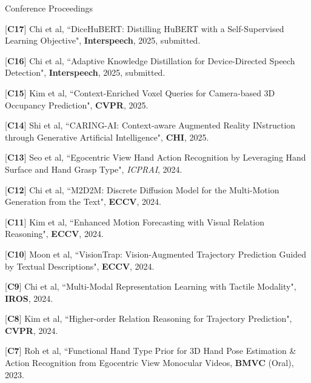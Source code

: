 


\begin{cventries}
\cvpub
{Conference Proceedings} %
{ %
\begin{cvitems}
    \item {[\textbf{C17}] Chi et al, ``DiceHuBERT: Distilling HuBERT with a Self-Supervised Learning Objective", \textbf{Interspeech}, 2025, submitted.}
    \item {[\textbf{C16}] Chi et al, ``Adaptive Knowledge Distillation for Device-Directed Speech Detection", \textbf{Interspeech}, 2025, submitted.}
    \item {[\textbf{C15}] Kim et al, ``Context-Enriched Voxel Queries for Camera-based 3D Occupancy Prediction", \textbf{CVPR}, 2025.}
    \item {[\textbf{C14}] Shi et al, ``CARING-AI: Context-aware Augmented Reality INstruction through Generative Artificial Intelligence", \textbf{CHI}, 2025.}
    \item {[\textbf{C13}] Seo et al, ``Egocentric View Hand Action Recognition by Leveraging Hand Surface and Hand Grasp Type", \textit{ICPRAI}, 2024. }
    \item {[\textbf{C12}] Chi et al, ``M2D2M: Discrete Diffusion Model for the Multi-Motion Generation from the Text", \textbf{ECCV}, 2024.}
    \item {[\textbf{C11}] Kim et al, ``Enhanced Motion Forecasting with Visual Relation Reasoning", \textbf{ECCV}, 2024.}
    \item {[\textbf{C10}] Moon et al, ``VisionTrap: Vision-Augmented Trajectory Prediction Guided by Textual Descriptions", \textbf{ECCV}, 2024.}
    \item {[\textbf{C9}] Chi et al, ``Multi-Modal Representation Learning with Tactile Modality", \textbf{IROS}, 2024.}
    \item {[\textbf{C8}] Kim et al, ``Higher-order Relation Reasoning for Trajectory Prediction", \textbf{CVPR}, 2024.}
    \item {[\textbf{C7}] Roh et al, ``Functional Hand Type Prior for 3D Hand Pose Estimation \& Action Recognition from Egocentric View Monocular Videos, \textbf{BMVC} (Oral), 2023.}

\end{cvitems}}
\end{cventries}
